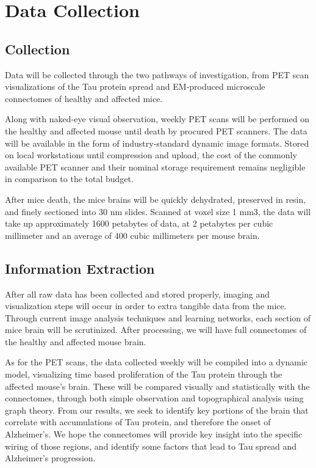 \documentclass[11pt]{article}
\begin{document}
\section{Data Collection}

\subsection{Collection}

Data will be collected through the two pathways of investigation, from PET scan visualizations of the Tau protein spread and EM-produced microscale connectomes of healthy and affected mice. 

Along with naked-eye visual observation, weekly PET scans will be performed on the healthy and affected mouse until death by procured PET scanners. The data will be available in the form of industry-standard dynamic image formats. Stored on local workstations until compression and upload, the cost of the commonly available PET scanner and their nominal storage requirement remains negligible in comparison to the total budget. 

After mice death, the mice brains will be quickly dehydrated, preserved in resin, and finely sectioned into 30 nm slides. Scanned at voxel size 1 mm3, the data will take up approximately 1600 petabytes of data, at 2 petabytes per cubic millimeter and an average of 400 cubic millimeters per mouse brain. 

\subsection{Information Extraction}

After all raw data has been collected and stored properly, imaging and visualization steps will occur in order to extra tangible data from the mice. Through current image analysis techniques and learning networks, each section of mice brain will be scrutinized. After processing, we will have full connectomes of the healthy and affected mouse brain. 

As for the PET scans, the data collected weekly will be compiled into a dynamic model, visualizing time based proliferation of the Tau protein through the affected mouse’s brain. These will be compared visually and statistically with the connectomes, through both simple observation and topographical analysis using graph theory. From our results, we seek to identify key portions of the brain that correlate with accumulations of Tau protein, and therefore the onset of Alzheimer's. We hope the connectomes will provide key insight into the specific wiring of those regions, and identify some factors that lead to Tau spread and Alzheimer’s progression. 
\end{document}
